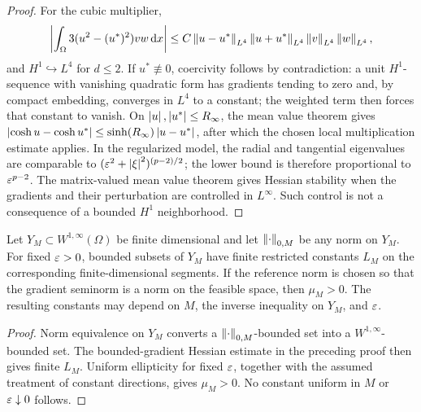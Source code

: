 \begin{proof}
For the cubic multiplier,
\[
 \left|\int_\Omega3(u^2-(u^*)^2)vw\,\mathrm{d} x\right|
 \leq C\left\lVert u-u^*\right\rVert_{L^4}\left\lVert u+u^*\right\rVert_{L^4}
 \left\lVert v\right\rVert_{L^4}\left\lVert w\right\rVert_{L^4},
\]
and \(H^1\hookrightarrow L^4\) for \(d\leq2\). If \(u^*\not\equiv0\), coercivity follows by
contradiction: a unit \(H^1\)-sequence with vanishing quadratic form has gradients tending to zero and,
by compact embedding, converges in \(L^4\) to a constant; the weighted term then forces that constant
to vanish. On \(\left\lvert u\right\rvert,\left\lvert u^*\right\rvert\leq R_\infty\), the mean
value theorem gives
\(\left\lvert \cosh u-\cosh u^*\right\rvert\leq\sinh(R_\infty)\left\lvert u-u^*\right\rvert\), after which the chosen local
multiplication estimate applies. In the regularized model, the radial and tangential eigenvalues are
comparable to \((\varepsilon^2+\left\lvert \xi\right\rvert^2)^{(p-2)/2}\); the lower bound is therefore proportional to
\(\varepsilon^{p-2}\). The matrix-valued mean value theorem gives Hessian stability when the gradients and
their perturbation are controlled in \(L^\infty\). Such control is not a consequence of a bounded
\(H^1\) neighborhood.
\end{proof}

\begin{proposition}
\label{prop:regularized-restricted}
Let \(Y_M\subset W^{1,\infty}(\Omega)\) be finite dimensional and let \(\left\lVert \cdot\right\rVert_{0,M}\) be any norm
on \(Y_M\). For fixed \(\varepsilon>0\), bounded subsets of \(Y_M\) have finite restricted constants
\(L_M\) on the corresponding finite-dimensional segments. If the reference norm is chosen so that the gradient seminorm is a
norm on the feasible space, then \(\mu_M>0\). The resulting constants may depend on \(M\), the inverse
inequality on \(Y_M\), and \(\varepsilon\).
\end{proposition}

\begin{proof}
Norm equivalence on \(Y_M\) converts a \(\left\lVert \cdot\right\rVert_{0,M}\)-bounded set into a
\(W^{1,\infty}\)-bounded set. The bounded-gradient Hessian estimate in the preceding proof then gives
finite \(L_M\). Uniform ellipticity for fixed \(\varepsilon\), together with the assumed treatment of constant
directions, gives \(\mu_M>0\). No constant uniform in \(M\) or \(\varepsilon\downarrow0\) follows.
\end{proof}

